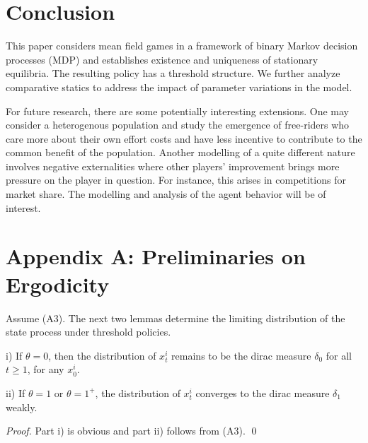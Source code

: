 \documentclass[graybox]{svmult}
\begin{document}
\section{Conclusion}
\label{sec:con}

This paper considers mean field games in a framework of binary Markov decision processes (MDP) and establishes existence and uniqueness  of  stationary  equilibria. The resulting policy has a threshold structure.
We further analyze comparative statics to address the impact of parameter variations in the model.

For future research, there are some potentially interesting extensions. One may consider a heterogenous population and study the emergence of free-riders who care more about their own effort costs and have less incentive to
contribute to the common benefit of the population. Another modelling of a quite different nature involves negative externalities where other players' improvement brings more pressure on the player in question. For instance, this arises in competitions for   market share. The modelling and  analysis of the agent behavior will be of interest.



\section*{Appendix A: Preliminaries on Ergodicity }
\renewcommand{\theequation}{A.\arabic{equation}}
\setcounter{equation}{0}
\renewcommand{\thetheorem}{A.\arabic{theorem}}
\setcounter{theorem}{0}
\renewcommand{\thelemma}{A.\arabic{lemma}}
\setcounter{lemma}{0}
\renewcommand{\theremark}{A.\arabic{remark}}
\setcounter{remark}{0}


Assume (A3).
The next two lemmas
determine the limiting distribution of the state process  under threshold policies.

\begin{lemma}\label{lemma:limd}
i)
If $\theta=0$, then the distribution of $x_t^i$ remains to be  the dirac measure $\delta_0$ for all $t\ge 1$, for any $x_0^i$.

ii) If $\theta=1$ or $\theta=1^+$, the distribution of $x_t^i$ converges to the dirac measure $\delta_1$ weakly.
\end{lemma}



\begin{proof}
Part i) is obvious and part ii)  follows from (A3).  \qed
\end{proof}
\end{document}
